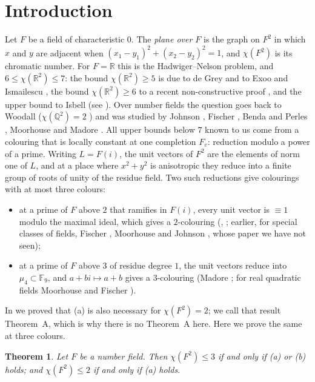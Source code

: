 \documentclass[11pt,a4paper]{amsart}
\newtheorem{theorem}{Theorem}
\theoremstyle{remark}
\newcommand{\Q}{\mathbb{Q}}
\newcommand{\R}{\mathbb{R}}
\newcommand{\F}{\mathbb{F}}
\begin{document}
\section{Introduction}

Let $F$ be a field of characteristic $0$. The \emph{plane over $F$} is the graph on $F^2$ in which $x$ and $y$ are
adjacent when $(x_1-y_1)^2+(x_2-y_2)^2=1$, and $\chi(F^2)$ is its chromatic number. For $F=\R$ this is the
Hadwiger--Nelson problem, and $6\le\chi(\R^2)\le7$: the bound $\chi(\R^2)\ge5$ is due to de Grey \cite{deGrey} and to
Exoo and Ismailescu \cite{EI}, the bound $\chi(\R^2)\ge6$ to a recent non-constructive proof \cite{OpenAI}, and the
upper bound to Isbell (see \cite{Soifer}). Over number fields the question goes back to
Woodall ($\chi(\Q^2)=2$ \cite{Woodall}) and was studied by Johnson \cite{Johnson1987}, Fischer \cite{Fischer1990},
Benda and Perles \cite{BP}, Moorhouse \cite{Moorhouse} and Madore \cite{Madore}. All upper bounds below $7$ known to us come from a colouring
that is locally constant at one completion $F_v$: reduction modulo a power of a prime. Writing $L=F(i)$, the unit
vectors of $F^2$ are the elements of norm one of $L$, and at a place where $x^2+y^2$ is anisotropic they reduce into
a finite group of roots of unity of the residue field. Two such reductions give colourings with at most three colours:
\begin{itemize}
\item[(a)] at a prime of $F$ above $2$ that ramifies in $F(i)$, every unit vector is $\equiv1$ modulo the maximal
ideal, which gives a $2$-colouring (\cite[Theorem~A$'$]{MM}, \cite[Proposition~3]{TC}; earlier, for special classes of
fields, Fischer \cite[Thm.~8]{Fischer1990}, Moorhouse \cite{Moorhouse} and Johnson \cite{Johnson1987}, whose paper we
have not seen);
\item[(b)] at a prime of $F$ above $3$ of residue degree $1$, the unit vectors reduce into $\mu_4\subset\F_9$, and
$a+bi\mapsto a+b$ gives a $3$-colouring (Madore \cite[Cor.~3.4]{Madore}; for real quadratic fields Moorhouse
\cite[Lemma~8.2 and Cor.~8.3]{Moorhouse} and Fischer \cite[Thm.~9]{Fischer1990}).
\end{itemize}
In \cite{TC} we proved that (a) is also necessary for $\chi(F^2)=2$; we call that result Theorem~A, which is why
there is no Theorem~A here. Here we prove the same at three colours.

\setcounter{theorem}{1}
\begin{theorem}\label{thm:B}
Let $F$ be a number field. Then $\chi(F^2)\le3$ if and only if (a) or (b) holds; and $\chi(F^2)\le2$ if and only
if (a) holds.
\end{theorem}
\end{document}
